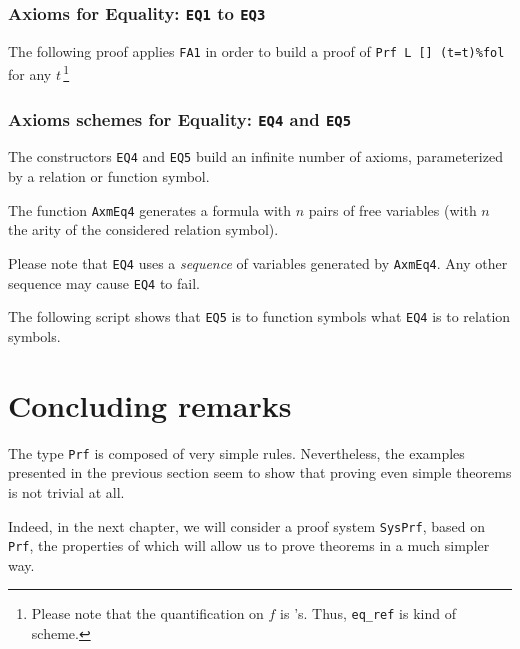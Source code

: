 



\subsubsection{Axioms for Equality: \texttt{EQ1} to \texttt{EQ3}}


The following proof applies \texttt{FA1} in order to build a proof
of \texttt{Prf L [] (t=t)\%fol}  for any $t$\,\footnote{Please note that the quantification on $f$ is \coq's. Thus, \texttt{eq\_ref} is kind of scheme.}



\subsubsection{Axioms schemes for Equality: \texttt{EQ4} and \texttt{EQ5}}

The constructors \texttt{EQ4}  and \texttt{EQ5} build an infinite number of axioms, parameterized by a  relation  or function symbol.

The function \texttt{AxmEq4} generates a formula with $n$ pairs of free variables (with $n$ the arity of the considered relation symbol).


Please note that \texttt{EQ4} uses a \emph{sequence} of variables generated by \texttt{AxmEq4}. Any other sequence may cause 
\texttt{EQ4} to fail.


The following script shows that \texttt{EQ5} is to function symbols 
what \texttt{EQ4} is to relation symbols.





\section{Concluding remarks}

The type \texttt{Prf} is composed of very simple rules.
Nevertheless, the examples presented in the previous section seem to show that proving even simple theorems is not trivial at all.


Indeed, in the next chapter, we will consider a proof system
\texttt{SysPrf}, based on \texttt{Prf}, the properties of which will 
allow us to prove theorems in a much simpler way.











